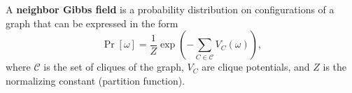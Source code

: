 A \textbf{neighbor Gibbs field} is a probability distribution on configurations of a graph that can be expressed in the form
$$\Pr[\omega] = \frac{1}{Z} \exp\left(-\sum_{C \in \mathcal{C}} V_C(\omega)\right),$$
where $\mathcal{C}$ is the set of cliques of the graph, $V_C$ are clique potentials, and $Z$ is the normalizing constant (partition function).